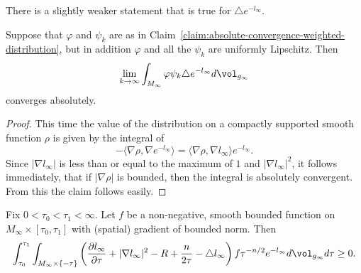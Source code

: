 There is a slightly weaker statement that is true for $\triangle
e^{-l_\infty}$.

\begin{claim}\label{claim:absolute-convergence-laplacian-term}
\label{absconv2}
Suppose that $\varphi$ and $\psi_k$ are as in Claim~\ref{claim:absolute-convergence-weighted-distribution},
but in addition $\varphi$ and all the $\psi_k$ are uniformly
Lipschitz. Then
$$\lim_{k\rightarrow\infty}\int_{M_\infty}\varphi\psi_k\triangle
e^{-l_\infty}d\vol_{g_\infty}$$ converges absolutely.
\end{claim}

\begin{proof}
This time the value of the distribution on a compactly supported
smooth function $\rho$ is given by the integral of $$-\langle
\nabla\rho,\nabla e^{-l_\infty}\rangle=\langle \nabla \rho,\nabla
l_\infty\rangle e^{-l_\infty}.$$ Since $|\nabla l_\infty|$ is less
than or equal to the maximum of $1$ and $|\nabla l_\infty|^2$, it
follows immediately, that if $|\nabla \rho|$ is bounded, then the
integral is absolutely convergent. From this the claim follows
easily.
\end{proof}


\begin{corollary}\label{cor:weak-inequality-nonnegative-integral}
\label{weakneg}
Fix $0<\tau_0<\tau_1<\infty$. Let $f$ be a non-negative, smooth
bounded function on $M_\infty\times [\tau_0,\tau_1]$ with (spatial)
gradient of bounded norm. Then
$$\int_{\tau_0}^{\tau_1}\int_{M_\infty\times\{-\tau\}}\left(\frac{\partial l_\infty}{\partial \tau}+|\nabla
l_\infty|^2-R+\frac{n}{2\tau}-\triangle
l_\infty\right)f\tau^{-n/2}e^{-l_\infty}d\vol_{g_\infty}d\tau\ge 0.$$
\end{corollary}


